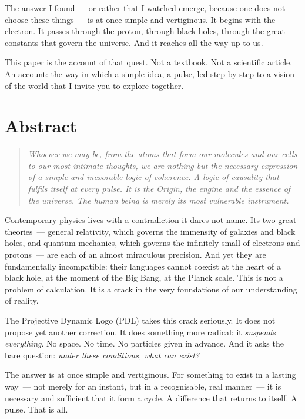\documentclass[12pt, a4paper, openright]{book}
\begin{document}
The answer I found --- or rather that I watched emerge, because one does not choose these things --- is at once simple and vertiginous. It begins with the electron. It passes through the proton, through black holes, through the great constants that govern the universe. And it reaches all the way up to us.

\medskip

This paper is the account of that quest. Not a textbook. Not a scientific article. An account: the way in which a simple idea, a pulse, led step by step to a vision of the world that I invite you to explore together.

\chapter*{Abstract}

\begin{quote}
\textit{Whoever we may be, from the atoms that form our molecules and our cells to our most intimate thoughts, we are nothing but the necessary expression of a simple and inexorable logic of coherence. A logic of causality that fulfils itself at every pulse. It is the Origin, the engine and the essence of the universe. The human being is merely its most vulnerable instrument.}
\end{quote}

\bigskip

Contemporary physics lives with a contradiction it dares not name. Its two great theories~--- general relativity, which governs the immensity of galaxies and black holes, and quantum mechanics, which governs the infinitely small of electrons and protons~--- are each of an almost miraculous precision. And yet they are fundamentally incompatible: their languages cannot coexist at the heart of a black hole, at the moment of the Big Bang, at the Planck scale. This is not a problem of calculation. It is a crack in the very foundations of our understanding of reality.

\medskip

The Projective Dynamic Logo (PDL) takes this crack seriously. It does not propose yet another correction. It does something more radical: it \emph{suspends everything}. No space. No time. No particles given in advance. And it asks the bare question: \emph{under these conditions, what can exist?}

\medskip

The answer is at once simple and vertiginous. For something to exist in a lasting way~--- not merely for an instant, but in a recognisable, real manner~--- it is necessary and sufficient that it form a cycle. A difference that returns to itself. A pulse. That is all.
\end{document}
